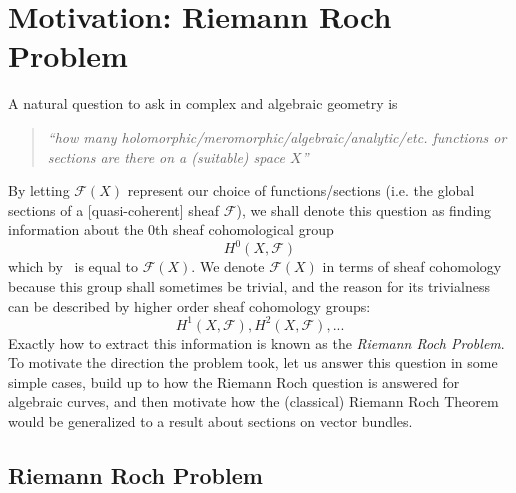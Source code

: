 \documentclass{ut-thesis}
\newcommand{\CF}{{\mathcal{F}}}
\begin{document}

\tableofcontents

\newpage
\chapter{Motivation: Riemann Roch Problem}\label{cha:motivation}


A natural question to ask in complex and algebraic geometry is
\begin{quote}
  \begin{center}
    \emph{``how many holomorphic/meromorphic/algebraic/analytic/etc. functions or sections are there on a (suitable) space
    $X$''}
\end{center}
\end{quote}

By letting $\CF(X)$ represent our choice of functions/sections (i.e. the global sections of a [quasi-coherent]
sheaf $\CF$), we shall denote this question as finding information about the $0$th sheaf cohomological group
\[
  H^0(X, \CF)
\]
which by~\cite{NateAlgGeo} is equal to $\CF(X)$. We denote $\CF(X)$ in terms of sheaf cohomology because this
group shall sometimes be trivial, and the reason for its trivialness can be described by higher order sheaf
cohomology groups:
\[
  H^1(X, \CF), H^2(X, \CF), ...
\]
Exactly how to extract this information is known as the \emph{Riemann Roch Problem}. To motivate the direction
the problem took, let us answer this question in some simple cases, build up to how the Riemann Roch question
is answered for algebraic curves, and then motivate how the (classical) Riemann Roch
Theorem would be generalized to a result about sections on vector bundles.

\section{Riemann Roch Problem}
\end{document}

